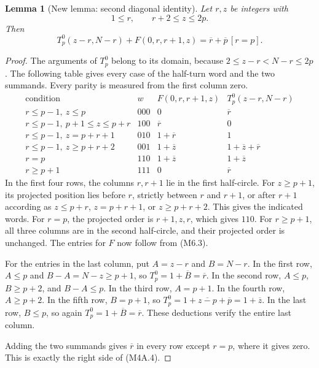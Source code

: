 \documentclass[11pt,oneside]{report}
\newtheorem{lemma}[theorem]{Lemma}
\theoremstyle{definition}
\numberwithin{equation}{section}
\begin{document}
\begin{lemma}[New lemma: second diagonal identity]
\label{J21:lem:h4-diagonal-primitive-second}
Let $r,z$ be integers with
\[
                       1\leq r,\qquad r+2\leq z\leq2p.
\]
Then
\[
 T_p^0(z-r,N-r)+F(0,r,r+1,z)
                   =\overline r+\overline p\,[r=p].
 \tag{M4A.4}
\]
\end{lemma}
\begin{proof}
The arguments of $T_p^0$ belong to its domain, because
$2\leq z-r<N-r\leq2p$.
The following table gives every case of the half-turn word and the
two summands. Every parity is measured from the first column zero.
\[
\begin{array}{c|c|c|c}
 \text{condition}&w&F(0,r,r+1,z)&T_p^0(z-r,N-r)\\ \hline
 r\leq p-1,\ z\leq p
       &000&0&\overline r\\
 r\leq p-1,\ p+1\leq z\leq p+r
       &100&\overline r&0\\
 r\leq p-1,\ z=p+r+1
       &010&1+\overline r&1\\
 r\leq p-1,\ z\geq p+r+2
       &001&1+\overline z&1+\overline z+\overline r\\
 r=p&110&1+\overline z&1+\overline z\\
 r\geq p+1&111&0&\overline r
\end{array}
 \tag{M4A.5}
\]
In the first four rows, the columns $r,r+1$ lie in the first
half-circle.
For $z\geq p+1$, its projected position lies before $r$,
strictly between $r$ and $r+1$, or after $r+1$ according as
$z\leq p+r$, $z=p+r+1$, or $z\geq p+r+2$.
This gives the indicated words.
For $r=p$, the projected order is $r+1,z,r$, which gives $110$.
For $r\geq p+1$, all three columns are in the second half-circle,
and their projected order is unchanged.
The entries for $F$ now follow from (M6.3).

For the entries in the last column, put $A=z-r$ and $B=N-r$.
In the first row, $A\leq p$ and $B-A=N-z\geq p+1$, so
$T_p^0=1+\overline B=\overline r$.
In the second row, $A\leq p$, $B\geq p+2$, and $B-A\leq p$.
In the third row, $A=p+1$.
In the fourth row, $A\geq p+2$.
In the fifth row, $B=p+1$, so
$T_p^0=1+\overline{z-p}+\overline p=1+\overline z$.
In the last row, $B\leq p$, so again
$T_p^0=1+\overline B=\overline r$.
These deductions verify the entire last column.

Adding the two summands gives $\overline r$ in every row except
$r=p$, where it gives zero.
This is exactly the right side of (M4A.4).
\end{proof}
\end{document}
